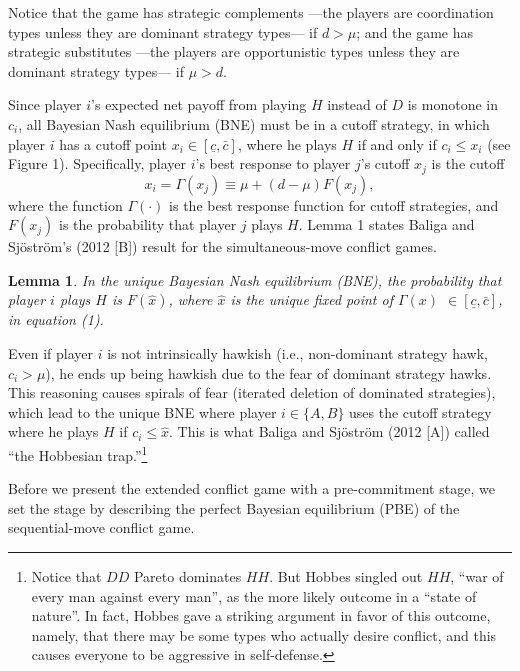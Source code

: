 \documentclass[12pt,english]{article}
\begin{document}
Notice that the game has strategic complements ---the players are coordination types unless they are dominant strategy types--- if $d>\mu$; and the game has strategic substitutes ---the players are opportunistic types unless they are dominant strategy types--- if $\mu> d$. \par
Since player $i$'s expected net payoff from playing $H$ instead of $D$ is monotone in $c_i$, all Bayesian Nash equilibrium (BNE) must be in a cutoff strategy, in which player $i$ has a cutoff point $x_i \in [\underline{c}, \bar{c}]$, where he plays $H$ if and only if $c_i \leq x_i$ (see Figure 1). Specifically, player $i$'s best response to player $j$'s cutoff $x_j$ is the cutoff
\begin{equation}
    x_i=\Gamma(x_j)\equiv \mu+(d-\mu)F(x_j),
\end{equation}
\noindent where the function $\Gamma(\cdot)$ is the best response function for cutoff strategies, and $F(x_j)$ is the probability that player $j$ plays $H$. Lemma 1 states Baliga and Sj\"ostr\"om's (2012 [B]) result for the simultaneous-move conflict games.
\newtheorem{lem}{Lemma}
\begin{lem}
In the unique Bayesian Nash equilibrium (BNE), the probability that player $i$ plays $H$ is $F(\hat{x})$, where $\hat{x}$ is the unique fixed point of $\Gamma(x)$  $ \in [\underline{c}, \bar{c}]$, in equation (1).
\end{lem}\par
Even if player $i$ is not intrinsically hawkish (i.e., non-dominant strategy hawk, $c_i >\mu$), he ends up being hawkish due to the fear of dominant strategy hawks. This reasoning causes spirals of fear (iterated deletion of dominated strategies), which lead to the unique BNE where player $i \in \{A,B\}$ uses the cutoff strategy where he plays $H$ if $c_i \leq \hat{x}$. This is what Baliga and Sj\"ostr\"om (2012 [A]) called ``the Hobbesian trap.''\footnote{Notice that $DD$ Pareto dominates $HH$. But Hobbes singled out $HH$, ``war of every man against every man'', as the more likely outcome in a ``state of nature''. In fact, Hobbes gave a striking argument in favor of this outcome, namely, that there may be some types who actually desire conflict, and this causes everyone to be aggressive in self-defense.}\par
Before we present the extended conflict game with a pre-commitment stage, we set the stage by describing the perfect Bayesian equilibrium (PBE) of the sequential-move conflict game. 
\end{document}
